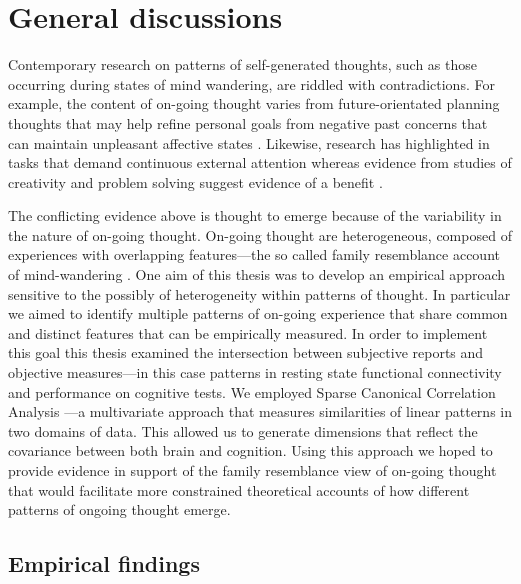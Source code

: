 \chapter{General discussions}
\label{ch:discussion}
Contemporary research on patterns of self-generated thoughts, such as those occurring during states of mind wandering, are riddled with contradictions. For example, the content of on-going thought varies from future-orientated planning thoughts that may help refine personal goals \cite{Medea2016} from negative past concerns that can maintain unpleasant affective states \cite{Killingsworth2010}. Likewise, research has highlighted in tasks that demand continuous external attention \cite{McVayJOEP2009,McVay2012} whereas evidence from studies of creativity and problem solving suggest evidence of a benefit \cite{Smeekens2016,Baird2012}.

The conflicting evidence above is thought to emerge because of the variability in the nature of on-going thought. On-going thought are heterogeneous, composed of experiences with overlapping features—the so called family resemblance account of mind-wandering \cite{Smallwood2013, Seli2018}. One aim of this thesis was to develop an empirical approach sensitive to the possibly of heterogeneity within patterns of thought. In particular we aimed to identify multiple patterns of on-going experience that share common and distinct features that can be empirically measured. In order to implement this goal this thesis examined the intersection between subjective reports and objective measures---in this case patterns in resting state functional connectivity and performance on cognitive tests. We employed Sparse Canonical Correlation Analysis \cite{WittenSCCA2009} ---a multivariate approach that measures similarities of linear patterns in two domains of data. This allowed us to generate dimensions that reflect the covariance between both brain and cognition. Using this approach we hoped to provide evidence in support of the family resemblance view of on-going thought that would facilitate more constrained theoretical accounts of how different patterns of ongoing thought emerge.

\section{Empirical findings}
\label{ch:discussion:results}

